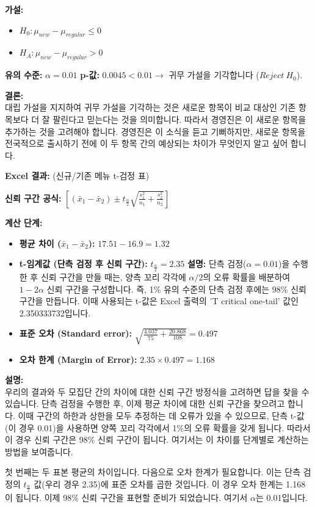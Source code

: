 \documentclass[11pt,a4paper]{book}
\theoremstyle{definition}
\begin{document}
\begin{infobox}[title=제품 테스트 (5/5): 최종 결론 및 경영진의 관심]
\textbf{가설:}
\begin{itemize}
    \item $H_0 : \mu_{new} - \mu_{regular} \le 0$
    \item $H_A : \mu_{new} - \mu_{regular} > 0$
\end{itemize}
\textbf{유의 수준:} $\alpha = 0.01$
\textbf{p-값:} $0.0045 < 0.01 \rightarrow$ 귀무 가설을 기각합니다 ($Reject \ H_0$).

\textbf{결론:} \\
대립 가설을 지지하여 귀무 가설을 기각하는 것은 새로운 항목이 비교 대상인 기존 항목보다 더 잘 팔린다고 믿는다는 것을 의미합니다.
따라서 경영진은 이 새로운 항목을 추가하는 것을 고려해야 합니다. 경영진은 이 소식을 듣고 기뻐하지만, 새로운 항목을 전국적으로 출시하기 전에 이 두 항목 간의 예상되는 차이가 무엇인지 알고 싶어 합니다.
\end{infobox}

\begin{infobox}[title=수요의 차이는 얼마나 될까? (1/2) - 신뢰 구간 계산 (단측 검정 후)]
\textbf{Excel 결과:} (신규/기존 메뉴 t-검정 표)

\textbf{신뢰 구간 공식:}
$\left[(\bar{x}_1 - \bar{x}_2) \pm t_{\frac{\alpha}{2}} \sqrt{\frac{s_1^2}{n_1} + \frac{s_2^2}{n_2}}\right]$

\textbf{계산 단계:}
\begin{itemize}
    \item \textbf{평균 차이 ($\bar{x}_1 - \bar{x}_2$):} $17.51 - 16.9 = 1.32$
    \item \textbf{t-임계값 (단측 검정 후 신뢰 구간):} $t_{\frac{\alpha}{2}} = 2.35$
    \textbf{설명:} 단측 검정($\alpha=0.01$)을 수행한 후 신뢰 구간을 만들 때는, 양측 꼬리 각각에 $\alpha/2$의 오류 확률을 배분하여 $1-2\alpha$ 신뢰 구간을 구성합니다. 즉, 1\% 유의 수준의 단측 검정 후에는 98\% 신뢰 구간을 만듭니다. 이때 사용되는 t-값은 Excel 출력의 'T critical one-tail' 값인 2.350333732입니다.
    \item \textbf{표준 오차 (Standard error):} $\sqrt{\frac{4.037}{75} + \frac{20.868}{108}} = 0.497$
    \item \textbf{오차 한계 (Margin of Error):} $2.35 \times 0.497 = 1.168$
\end{itemize}

\textbf{설명:} \\
우리의 결과와 두 모집단 간의 차이에 대한 신뢰 구간 방정식을 고려하면 답을 찾을 수 있습니다. 단측 검정을 수행한 후, 이제 평균 차이에 대한 신뢰 구간을 찾으려고 합니다. 이때 구간의 하한과 상한을 모두 추정하는 데 오류가 있을 수 있으므로, 단측 t-값(이 경우 0.01)을 사용하면 양쪽 꼬리 각각에서 1\%의 오류 확률을 갖게 됩니다. 따라서 이 경우 신뢰 구간은 98\% 신뢰 구간이 됩니다. 여기서는 이 차이를 단계별로 계산하는 방법을 보여줍니다.

첫 번째는 두 표본 평균의 차이입니다. 다음으로 오차 한계가 필요합니다. 이는 단측 검정의 $t_{\frac{\alpha}{2}}$ 값(우리 경우 2.35)에 표준 오차를 곱한 것입니다. 이 경우 오차 한계는 1.168이 됩니다. 이제 98\% 신뢰 구간을 표현할 준비가 되었습니다. 여기서 $\alpha$는 0.01입니다.
\end{infobox}
\end{document}
